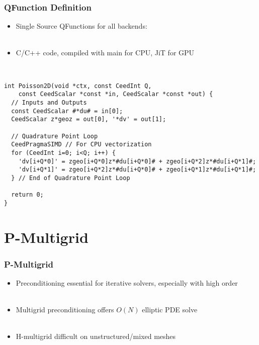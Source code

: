 \documentclass{beamer}
\begin{document}
\begin{frame}[fragile]
\begin{center}
\frametitle{QFunction Definition}

\begin{itemize}

\item Single Source QFunctions for all backends:\\

~\\

\item C/C++ code, compiled with main for CPU, JiT for GPU\\

\end{itemize}

~\\

{\scriptsize
\begin{lstlisting}[style=qfunc]
int Poisson2D(void *ctx, const CeedInt Q,
    const CeedScalar *const *in, CeedScalar *const *out) {
  // Inputs and Outputs
  const CeedScalar #*du# = in[0];
  CeedScalar z*geoz = out[0], '*dv' = out[1];

  // Quadrature Point Loop
  CeedPragmaSIMD // For CPU vectorization
  for (CeedInt i=0; i<Q; i++) {
    'dv[i+Q*0]' = zgeo[i+Q*0]z*#du[i+Q*0]# + zgeo[i+Q*2]z*#du[i+Q*1]#;
    'dv[i+Q*1]' = zgeo[i+Q*2]z*#du[i+Q*0]# + zgeo[i+Q*1]z*#du[i+Q*1]#;
  } // End of Quadrature Point Loop

  return 0;
}
\end{lstlisting}
}

\end{center}
\end{frame}

\section{P-Multigrid}

\begin{frame}
\begin{center}
\frametitle{P-Multigrid}

\begin{itemize}

\item Preconditioning essential for iterative solvers, especially with high order\\

~\\

\item Multigrid preconditioning offers $O(N)$ elliptic PDE solve\\

~\\

\item H-multigrid difficult on unstructured/mixed meshes

\end{itemize}

\end{center}
\end{frame}
\end{document}

